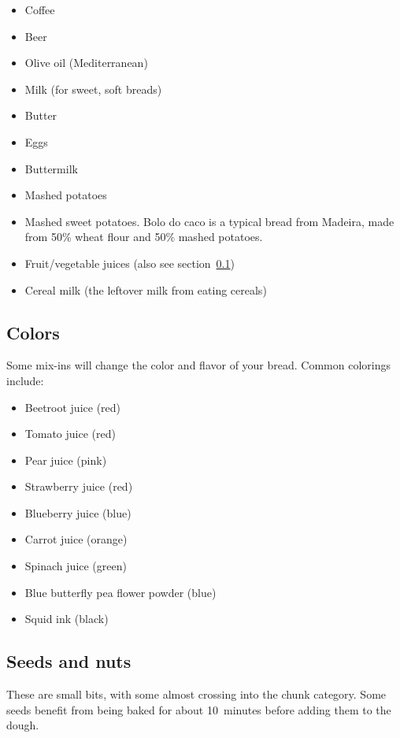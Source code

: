 \begin{itemize}
  \item Coffee
  \item Beer
  \item Olive oil (Mediterranean)
  \item Milk (for sweet, soft breads)
  \item Butter
  \item Eggs
  \item Buttermilk
  \item Mashed potatoes
  \item Mashed sweet potatoes. Bolo do caco is a typical bread from Madeira,
    made from 50\% wheat flour and 50\% mashed potatoes.
  \item Fruit/vegetable juices (also see section~\ref{section:colors})
  \item Cereal milk (the leftover milk from eating cereals)
\end{itemize}

\subsection{Colors}
\label{section:colors}
Some mix-ins will change the color and flavor of your bread. Common colorings
include:

\begin{itemize}
  \item Beetroot juice (red)
  \item Tomato juice (red)
  \item Pear juice (pink)
  \item Strawberry juice (red)
  \item Blueberry juice (blue)
  \item Carrot juice (orange)
  \item Spinach juice (green)
  \item Blue butterfly pea flower powder (blue)
  \item Squid ink (black)
\end{itemize}

\subsection{Seeds and nuts}
These are small bits, with some almost crossing into the chunk category. Some
seeds benefit from being baked for about 10~minutes before adding them to the
dough.

